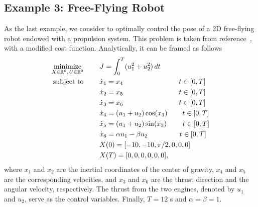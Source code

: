 \subsection*{Example 3: Free-Flying Robot}
As the last example, we consider to optimally control the pose of a 2D free-flying robot endowed with a propulsion system. This problem is taken from reference~\cite{Betts:book:2010}, with a modified cost function. Analytically, it can be framed as follows
\begin{subequations}\label{eq:free}
	\begin{align}
	\underset{X \in \mathbb{R}^{6}, \, U \in \mathbb{R}^{2}}{\text{minimize}}\hspace{8mm}
	&J = \int_{0}^{T}(u_{1}^{2} +  u_{2}^{2})\,dt  \label{eq:freecost}\\
	\text{subject to} \hspace{8mm}
	& \dot{x}_1 = x_4 \hspace{28mm} t \in[0,T] \label{eq:freedyn1}\\
	& \dot{x}_2 = x_5 \hspace{28mm} t \in[0,T] \label{eq:freedyn2}\\
	& \dot{x}_3 = x_6\hspace{28mm} t \in[0,T] \label{eq:freedyn3}\\
	& \dot{x}_4 = (u_1 + u_2)\cos(x_3)\hspace{7.5mm} t \in[0,T] \label{eq:freedyn4}\\
	& \dot{x}_5 = (u_1 + u_2)\sin(x_3)\hspace{8mm} t \in[0,T] \label{eq:freedyn5}\\
	& \dot{x}_6 = \alpha u_1 - \beta u_2\hspace{16mm} t \in[0,T] \label{eq:freedyn6}\\
	&X(0) = [-10, -10, \pi/2, 0, 0, 0]\\
	&X(T) = [0, 0, 0, 0, 0, 0], \label{eq:freefinal1}		
	\end{align}
\end{subequations}
where $x_1$ and $x_2$ are the inertial coordinates of the center of gravity, $x_4$ and $x_5$ are the corresponding velocities, and $x_3$ and $x_6$ are the thrust direction and the angular velocity, respectively. The thrust from the two engines, denoted by $u_1$ and $u_2$, serve as the control variables. Finally, $T = 12$ s and $\alpha = \beta = 1$.
